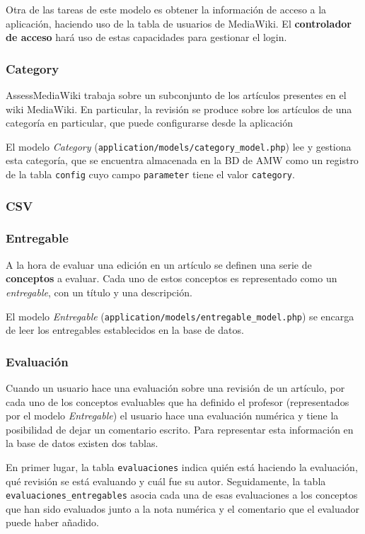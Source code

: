 \documentclass[11pt]{article}
\begin{document}
Otra de las tareas de este modelo es obtener la información de acceso a la
aplicación, haciendo uso de la tabla de usuarios de MediaWiki. El
\textbf{controlador de acceso} hará uso de estas capacidades para gestionar el
login.

\subsubsection{Category}

AssessMediaWiki trabaja sobre un subconjunto de los artículos presentes en el
wiki MediaWiki. En particular, la revisión se produce sobre los artículos de una
categoría en particular, que puede configurarse desde la aplicación

El modelo \textit{Category} (\texttt{application/models/category\_model.php})
lee y gestiona esta categoría, que se encuentra almacenada en la BD de AMW como
un registro de la tabla \texttt{config} cuyo campo \texttt{parameter} tiene el
valor \texttt{category}.

\subsubsection{CSV}

\subsubsection{Entregable}

A la hora de evaluar una edición en un artículo se definen una serie de
\textbf{conceptos} a evaluar. Cada uno de estos conceptos es representado como
un \textit{entregable}, con un título y una descripción.

El modelo \textit{Entregable}
(\texttt{application/models/entregable\_model.php}) se encarga de leer los
entregables establecidos en la base de datos.

\subsubsection{Evaluación}

Cuando un usuario hace una evaluación sobre una revisión de un artículo, por
cada uno de los conceptos evaluables que ha definido el profesor (representados
por el modelo \textit{Entregable}) el usuario hace una evaluación numérica y
tiene la posibilidad de dejar un comentario escrito. Para representar esta
información en la base de datos existen dos tablas. 

En primer lugar, la tabla \texttt{evaluaciones} indica quién está haciendo la
evaluación, qué revisión se está evaluando y cuál fue su autor. Seguidamente, la
tabla \texttt{evaluaciones\_entregables} asocia cada una de esas evaluaciones a
los conceptos que han sido evaluados junto a la nota numérica y el comentario
que el evaluador puede haber añadido.
\end{document}
